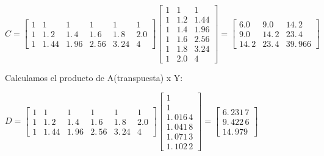 \documentclass{article}
\begin{document}
$C=\left[ 
\begin{array}{cccccc}
1 & 1 & 1 & 1 & 1 & 1 \\ 
1 & 1.\,\allowbreak 2 & 1.\,\allowbreak 4 & 1.\,\allowbreak 6 & 
1.\,\allowbreak 8 & 2.0 \\ 
1 & 1.\,\allowbreak 44 & 1.\,\allowbreak 96 & 2.\,\allowbreak 56 & 
3.\,\allowbreak 24 & 4%
\end{array}%
\right] \left[ 
\begin{array}{ccc}
1 & 1 & 1 \\ 
1 & 1.2 & 1.44 \\ 
1 & 1.4 & 1.96 \\ 
1 & 1.6 & 2.56 \\ 
1 & 1.8 & 3.24 \\ 
1 & 2.0 & 4%
\end{array}%
\right] =\allowbreak \left[ 
\begin{array}{ccc}
6.0 & 9.0 & 14.\,\allowbreak 2 \\ 
9.0 & 14.\,\allowbreak 2 & 23.\,\allowbreak 4 \\ 
14.\,\allowbreak 2 & 23.\,\allowbreak 4 & 39.\,\allowbreak 966%
\end{array}%
\right] \allowbreak $

\bigskip

Calculamos el producto de A(transpuesta) x Y:

$D=\left[ 
\begin{array}{cccccc}
1 & 1 & 1 & 1 & 1 & 1 \\ 
1 & 1.\,\allowbreak 2 & 1.\,\allowbreak 4 & 1.\,\allowbreak 6 & 
1.\,\allowbreak 8 & 2.0 \\ 
1 & 1.\,\allowbreak 44 & 1.\,\allowbreak 96 & 2.\,\allowbreak 56 & 
3.\,\allowbreak 24 & 4%
\end{array}%
\right] \left[ 
\begin{array}{c}
1 \\ 
1 \\ 
1.\,\allowbreak 016\,4 \\ 
1.\,\allowbreak 041\,8 \\ 
1.\,\allowbreak 071\,3 \\ 
1.\,\allowbreak 102\,2%
\end{array}%
\right] =\allowbreak \left[ 
\begin{array}{c}
6.\,\allowbreak 231\,7 \\ 
9.\,\allowbreak 422\,6 \\ 
14.\,\allowbreak 979%
\end{array}%
\right] $
\end{document}
